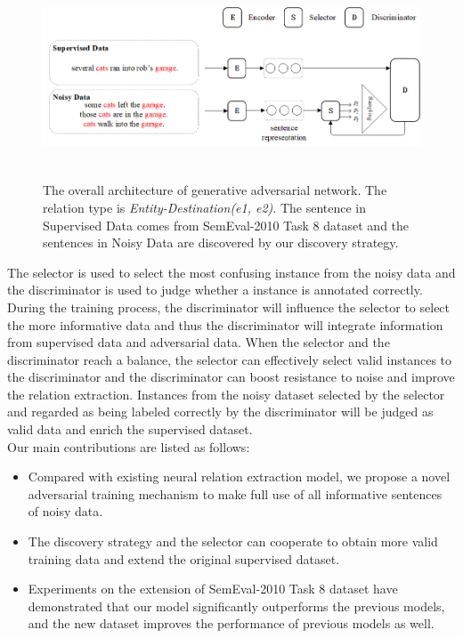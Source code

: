 \documentclass[conference]{IEEEtran}
\begin{document}
\begin{figure}[h]
  \includegraphics[height=6cm]{architecture.png}
  \caption{The overall architecture of generative adversarial network. The relation type is \textit{Entity-Destination(e1, e2)}. The sentence in Supervised Data comes from SemEval-2010 Task 8 dataset and the sentences in Noisy Data are discovered by our discovery strategy. }
  \label{Architecture}
\end{figure}

The selector is used to select the most confusing instance from the noisy data and the discriminator is used to judge whether a instance is annotated correctly.
During the training process, the discriminator will influence the selector to select the more informative data and thus the discriminator will integrate information from supervised data and adversarial data.  
When the selector and the discriminator reach a balance, the selector can effectively select valid instances to the discriminator and the discriminator can boost resistance to noise and improve the relation extraction.
Instances from the noisy dataset selected by the selector and regarded as being labeled correctly by the discriminator will be judged as valid data and enrich the supervised dataset.
\\Our main contributions are listed as follows:
\begin{itemize}
  \item Compared with existing neural relation extraction model, we propose a novel adversarial training mechanism to make full use of all informative sentences of noisy data.
  \item The discovery strategy and the selector can cooperate to obtain more valid training data and extend the original supervised dataset.
  \item Experiments on the extension of SemEval-2010 Task 8 dataset have demonstrated that our model significantly outperforms the previous models, and the new dataset improves the performance of previous models as well.
\end{itemize}
\end{document}
